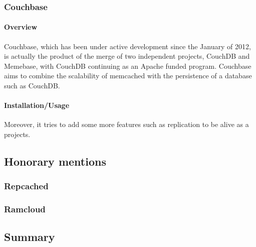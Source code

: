 \subsubsection{Couchbase}

\paragraph{Overview}

Couchbase, which has been under active development since the January of 2012, 
is actually the product of the merge of two independent projects, CouchDB and 
Memebase, with CouchDB continuing as an Apache funded program. Couchbase aims 
to combine the scalability of memcached with the persistence of a database such 
as CouchDB. 

\paragraph{Installation/Usage}

Moreover, it tries to add some more features such as replication
to be alive as a projects.

\subsection{Honorary mentions}

\subsubsection{Repcached}

\subsubsection{Ramcloud}

\subsection{Summary}





